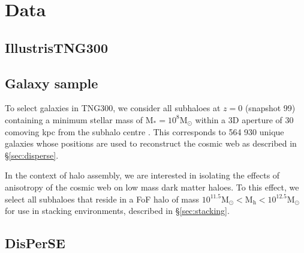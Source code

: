 \section{Data}
\subsection{IllustrisTNG300}

\subsection{Galaxy sample} \label{sec:gal_samp}
To select galaxies in TNG300, we consider all subhaloes at $z=0$ (snapshot 99) containing a minimum stellar mass of $\mathrm{M_{\ast} = 10^{8} M_{\odot}}$ within a 3D aperture of 30 comoving kpc from the subhalo centre \citep[as defined in;][]{pillepich18b}. This corresponds to 564 930 unique galaxies whose positions are used to reconstruct the cosmic web as described in \S\ref{sec:disperse}.

In the context of halo assembly, we are interested in isolating the effects of anisotropy of the cosmic web on low mass dark matter haloes. To this effect, we select all subhaloes that reside in a FoF halo of mass $\mathrm{10^{11.5} M_{\odot} < M_{h} < 10^{12.5} M_{\odot}}$ for use in stacking environments, described in \S\ref{sec:stacking}.

\subsection{DisPerSE}

